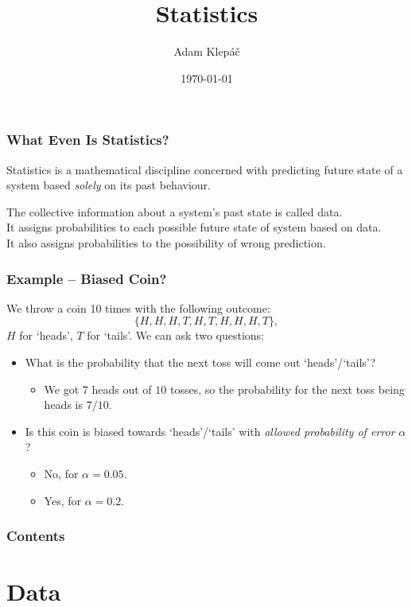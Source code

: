 \documentclass[aspectratio=169,11pt,svgnames]{beamer}
\title{Statistics}
\date{\today}
\author{Adam Klepáč}
\institute[GEVO]{Gymnázium Evolution Jižní Město}
\begin{document}
\titleframe

\begin{frame}
 \frametitle{What Even Is Statistics?}
 \begin{tcolorbox}[title=Statistics]
  \alert{Statistics} is a mathematical discipline concerned with predicting
  future state of a system based \emph{solely} on its past behaviour.
 \end{tcolorbox}
 \pause
 The collective information about a system's past state is called
 \alert{data}.\\
 \pause
 It assigns \alert{probabilities} to each possible future state of system based
 on data.\\
 \pause
 It also assigns probabilities to the \alert{possibility of wrong prediction}.
\end{frame}

\begin{frame}
 \frametitle{Example -- Biased Coin?}
 We throw a coin 10 times with the following outcome:
 \[
  \{H,H,H,T,H,T,H,H,H,T\},
 \]
 $H$ for `heads', $T$ for `tails'.
 \pause
 We can ask two questions:
 \pause
 \begin{itemize}[label=\textbullet]
  \item<3-> What is the probability that the \alert{next toss} will come out
   `heads'/`tails'?
  \begin{itemize}[label=\textminus]
   \item<5-> We got $7$ heads out of $10$ tosses, so the probability for the next toss
    being heads is $7 / 10$.
  \end{itemize}
  \item<4-> Is this coin is \alert{biased towards} `heads'/`tails' with
   \emph{allowed probability of error} $\alpha$?
   \begin{itemize}[label=\textminus]
    \item<6-> \alert{No}, for $\alpha = 0.05$.
    \item<6-> \alert{Yes}, for $\alpha = 0.2$.
   \end{itemize}
 \end{itemize}
\end{frame}

\begin{frame}
 \frametitle{Contents}
 \tableofcontents
\end{frame}

\section{Data}
\end{document}
